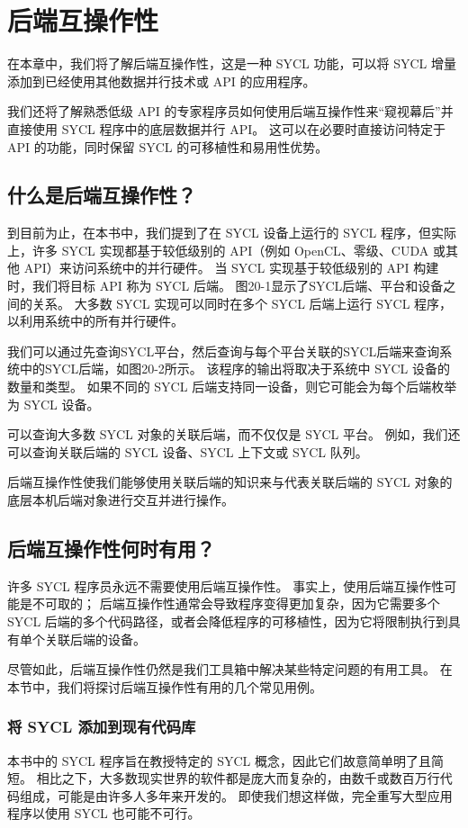 \section{后端互操作性}
在本章中，我们将了解后端互操作性，这是一种 SYCL 功能，可以将 SYCL 增量添加到已经使用其他数据并行技术或 API 的应用程序。

我们还将了解熟悉低级 API 的专家程序员如何使用后端互操作性来“窥视幕后”并直接使用 SYCL 程序中的底层数据并行 API。 这可以在必要时直接访问特定于 API 的功能，同时保留 SYCL 的可移植性和易用性优势。

\subsection{什么是后端互操作性？}
到目前为止，在本书中，我们提到了在 SYCL 设备上运行的 SYCL 程序，但实际上，许多 SYCL 实现都基于较低级别的 API（例如 OpenCL、零级、CUDA 或其他 API）来访问系统中的并行硬件。 当 SYCL 实现基于较低级别的 API 构建时，我们将目标 API 称为 SYCL 后端。 图20-1显示了SYCL后端、平台和设备之间的关系。 大多数 SYCL 实现可以同时在多个 SYCL 后端上运行 SYCL 程序，以利用系统中的所有并行硬件。

我们可以通过先查询SYCL平台，然后查询与每个平台关联的SYCL后端来查询系统中的SYCL后端，如图20-2所示。 该程序的输出将取决于系统中 SYCL 设备的数量和类型。 如果不同的 SYCL 后端支持同一设备，则它可能会为每个后端枚举为 SYCL 设备。

可以查询大多数 SYCL 对象的关联后端，而不仅仅是 SYCL 平台。 例如，我们还可以查询关联后端的 SYCL 设备、SYCL 上下文或 SYCL 队列。

后端互操作性使我们能够使用关联后端的知识来与代表关联后端的 SYCL 对象的底层本机后端对象进行交互并进行操作。

\subsection{后端互操作性何时有用？}
许多 SYCL 程序员永远不需要使用后端互操作性。 事实上，使用后端互操作性可能是不可取的； 后端互操作性通常会导致程序变得更加复杂，因为它需要多个 SYCL 后端的多个代码路径，或者会降低程序的可移植性，因为它将限制执行到具有单个关联后端的设备。

尽管如此，后端互操作性仍然是我们工具箱中解决某些特定问题的有用工具。 在本节中，我们将探讨后端互操作性有用的几个常见用例。

\subsubsection{将 SYCL 添加到现有代码库}
本书中的 SYCL 程序旨在教授特定的 SYCL 概念，因此它们故意简单明了且简短。 相比之下，大多数现实世界的软件都是庞大而复杂的，由数千或数百万行代码组成，可能是由许多人多年来开发的。 即使我们想这样做，完全重写大型应用程序以使用 SYCL 也可能不可行。

